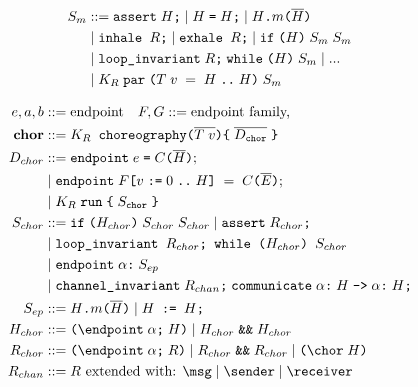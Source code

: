 \begin{figure}[t]
\begin{adjustwidth}{-0.15\paperwidth}{-0.15\paperwidth}
\begin{minipage}{0.5\textwidth}
\begin{align*}
S_{m} &::= \texttt{assert} \; H \texttt{;} \mid H \; \texttt{=} \; H\texttt{;} \mid \texttt{$H$.$m$($\overline{H}$)} \\
& \mid \texttt{inhale $R$;} \mid \texttt{exhale $R$;} \mid \texttt{if} \; \texttt{(}H\texttt{)} \; S_m \; S_m \\
& \mid \texttt{loop\_invariant} \; R\texttt{;} \; \texttt{while} \; \texttt{(}H\texttt{)} \; S_m \mid ...\\
& \mid K_R \; \texttt{par} \; \texttt{(}T \; v \; = \; H \; \texttt{..} \; H\texttt{)} \; S_m 
\end{align*}
\end{minipage}%
\hfill
\begin{minipage}{0.5\textwidth}
\begin{align*}
e, a, b &::= \textrm{endpoint} \quad F, G ::= \textrm{endpoint family,} \\
\textrm{\textbf{chor}} &::= \texttt{$K_R$ choreography} \parens{\overline{T \; v}} \braces{ \; \overline{D_{\texttt{chor}}} \;} \\
D_{chor} &::= \texttt{endpoint} \; e \; \texttt{=} \; C \parens{\overline{H}} ; \\
& \mid \texttt{endpoint} \; F \brackets{v \; \texttt{:=} \; 0 \; \texttt{..} \; H} \; = \; C \parens{\overline{E}} ; \\
& \mid K_R \; \texttt{run} \; \braces{\; S_{\texttt{chor}} \;}  \\
S_{chor} &::= \texttt{if} \; \parens{H_{chor}} \; S_{chor} \; S_{chor} \mid \texttt{assert} \; R_{chor}\texttt{;} \\
& \mid \texttt{loop\_invariant $R_{chor}$; while ($H_{chor}$) $S_{chor}$} \\
& \mid \texttt{endpoint} \; \alpha\texttt{:} \; S_{ep} \\
& \mid \texttt{channel\_invariant} \; R_{chan}\texttt{;} \; \texttt{communicate} \; \alpha\texttt{:} \; H \; \texttt{->} \; \alpha\texttt{:} \; H\texttt{;} \\
S_{ep} &::= H\texttt{.}m\parens{\overline{H}} \mid \texttt{$H$ := $H$;} \\
H_{chor} &::= \parens{\kwepexpr{} \; \alpha\texttt{;} \; H} \mid H_{chor} \; \texttt{\&\&} \; H_{chor} \\ 
R_{chor} &::= \parens{\kwepexpr{} \; \alpha\texttt{;} \; R} \mid R_{chor} \; \texttt{\&\&} \; R_{chor} \mid \parens{\kwchor{} \; H} \\ %
R_{chan} &::= \textrm{$R$ extended with: $\kwmsg{} \mid \kwsender{} \mid \kwreceiver{}$} \\

\end{align*}
\end{minipage}
\end{adjustwidth}
\end{figure}
